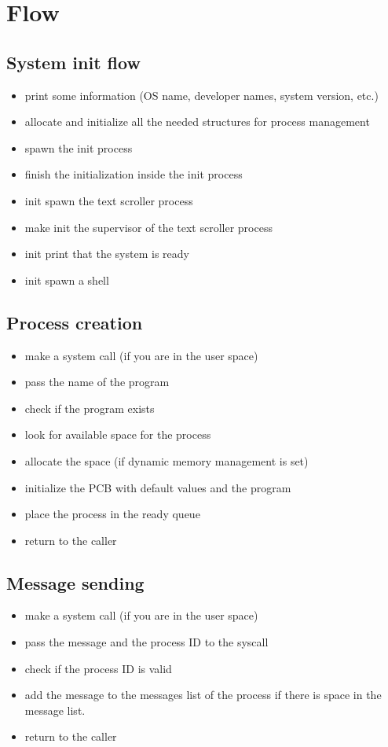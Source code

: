 \chapter{Flow}

\section{System init flow}

\begin{itemize}
  \item print some information (OS name, developer names, system version, etc.)
  \item allocate and initialize all the needed structures for process management
  \item spawn the init process
  \item finish the initialization inside the init process
  \item init spawn the text scroller process
  \item make init the supervisor of the text scroller process
  \item init print that the system is ready
  \item init spawn a shell
\end{itemize}

\section{Process creation}

\begin{itemize}
  \item make a system call (if you are in the user space)
  \item pass the name of the program
  \item check if the program exists
  \item look for available space for the process
  \item allocate the space (if dynamic memory management is set)
  \item initialize the PCB with default values and the program
  \item place the process in the ready queue
  \item return to the caller
\end{itemize}

\section{Message sending}

\begin{itemize}
  \item make a system call (if you are in the user space)
  \item pass the message and the process ID to the syscall
  \item check if the process ID is valid
  \item add the message to the messages list of the process if there is space in the message list.
  \item return to the caller
\end{itemize} 
